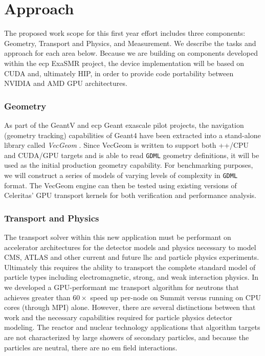 \documentclass[10pt]{article}
\begin{document}
\section*{Approach}

The proposed work scope for this first year effort includes three
components: Geometry, Transport and Physics, and Measurement. We
describe the tasks and approach for each area below. Because we are
building on components developed within the \ac{ecp} ExaSMR project, the
device implementation will be based on CUDA and, ultimately HIP, in
order to provide code portability between NVIDIA and AMD GPU
architectures.

\subsubsection*{Geometry}

As part of the GeantV and \ac{ecp} Geant exascale pilot projects, the navigation
(geometry tracking) capabilities of Geant4 have been extracted into a
stand-alone library called \emph{VecGeom} \cite{apostolakis_towards_2015}.
Since VecGeom is written to support both \C++/CPU and CUDA/GPU targets
and is able to read \texttt{GDML} geometry definitions, it will be used
as the initial production geometry capability. For benchmarking
purposes, we will construct a series of models of varying levels of
complexity in \texttt{GDML} format. The VecGeom engine can then be
tested using existing versions of Celeritas' GPU transport kernels for both
verification and performance analysis.

\subsubsection*{Transport and Physics}

The transport solver within this new application must be performant on
accelerator architectures for the detector models and physics necessary
to model CMS, ATLAS and other current and future \ac{lhc} and particle
physics experiments. Ultimately this requires the ability to transport
the complete standard model of particle types including electromagnetic,
strong, and weak interaction physics. In \textcite{hamilton_continuous-energy_2019} we
developed a GPU-performant \ac{mc} transport algorithm for neutrons that
achieves greater than $60\times$ speed up per-node on Summit versus
running on CPU cores (through MPI) alone. However, there are several
distinctions between that work and the necessary capabilities required
for particle physics detector modeling. The reactor and nuclear
technology applications that algorithm targets are not characterized by
large showers of secondary particles, and because the particles are
neutral, there are no \ac{em} field interactions.
\end{document}
